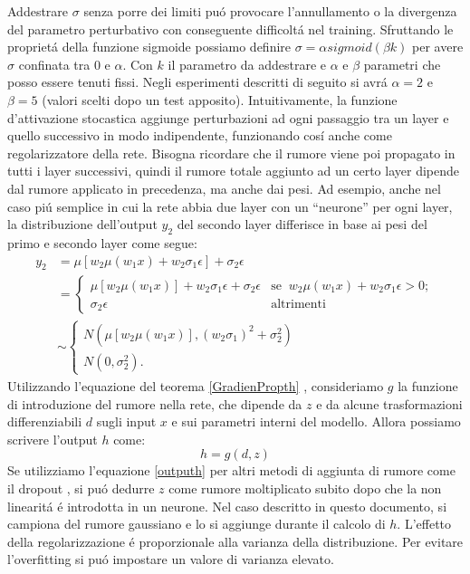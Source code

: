 \documentclass[a4paper,12pt]{report}
\begin{document}
 Addestrare $\sigma$ senza porre dei limiti pu\'o provocare l'annullamento o la divergenza del parametro perturbativo con conseguente difficolt\'a nel training. 
 Sfruttando le propriet\'a della funzione sigmoide possiamo definire $\sigma = \alpha sigmoid(\beta k)$ per avere $\sigma$ confinata tra $0$ e $\alpha$. 
 Con $k$ il parametro da addestrare e $\alpha$ e $\beta$ parametri che posso essere tenuti fissi. 
 Negli esperimenti descritti di seguito si avr\'a $\alpha = 2$ e $\beta = 5$ (valori scelti dopo un test apposito). 
 Intuitivamente, la funzione d'attivazione stocastica aggiunge perturbazioni ad ogni passaggio tra un layer e quello successivo in modo indipendente, funzionando cos\'i anche come regolarizzatore della rete. 
 Bisogna ricordare che il rumore viene poi propagato in tutti i layer successivi, quindi il rumore totale aggiunto ad un certo layer dipende dal rumore applicato in precedenza, ma anche dai pesi. 
 Ad esempio, anche nel caso pi\'u semplice in cui la rete abbia due layer con un ``neurone'' per ogni layer, la distribuzione dell'output $y_2$ del secondo layer differisce in base ai pesi del primo e secondo layer come segue:
 \begin{align}
  y_2 &= \mu \left[ w_2\mu\left(w_1 x\right) + w_2\sigma_1\epsilon\right] + \sigma_2\epsilon\\
  &= 
  \begin{cases}
   \mu\left[ w_2\mu\left(w_1 x\right)\right] + w_2\sigma_1\epsilon + \sigma_2\epsilon & \mbox{se} \;\; w_2\mu\left(w_1 x\right) + w_2\sigma_1\epsilon>0;\\
   \sigma_2\epsilon & \mbox{altrimenti}
  \end{cases} \\
  &\sim 
  \begin{cases}
   N\left(\mu\left[w_2\mu\left(w_1 x\right)\right],\left(w_2\sigma_1\right)^2 + \sigma_2^2\right)\\
   N\left(0,\sigma_2^2\right).
  \end{cases}
 \end{align}
 Utilizzando l'equazione del teorema \ref{GradienPropth} , consideriamo $g$ la funzione di introduzione del rumore nella rete, che dipende da $z$ e da alcune trasformazioni differenziabili $d$ sugli input $x$ e sui parametri interni del modello. 
 Allora possiamo scrivere l'output $h$ come:
 \begin{equation}
  h = g(d,z) \label{outputh}
 \end{equation}
 Se utilizziamo l'equazione \ref{outputh} per altri metodi di aggiunta di rumore come il dropout \cite{cai2019effective}, si pu\'o dedurre $z$ come rumore moltiplicato subito dopo che la non linearit\'a \'e introdotta in un neurone. 
 Nel caso descritto in questo documento, si campiona del rumore gaussiano e lo si aggiunge durante il calcolo di $h$. 
 L'effetto della regolarizzazione \'e proporzionale alla varianza della distribuzione. 
 Per evitare l'overfitting si pu\'o impostare un valore di varianza elevato.
 
\end{document}
